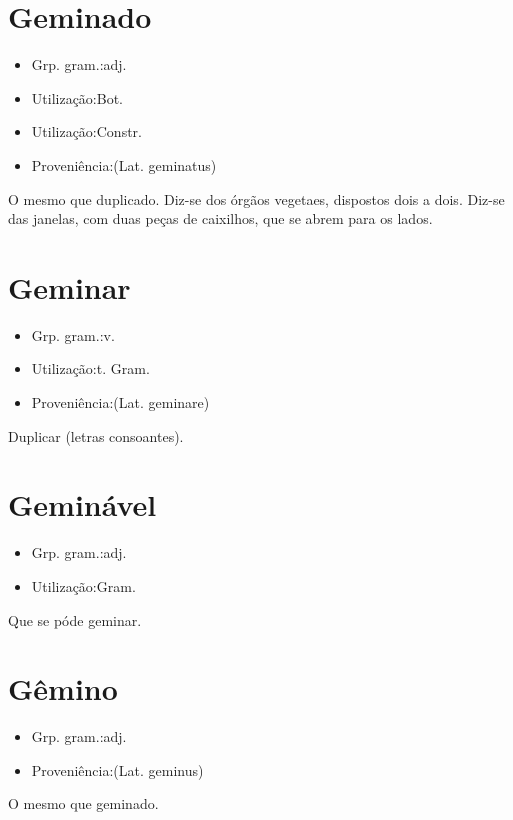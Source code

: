 \section{Geminado}
\begin{itemize}
\item {Grp. gram.:adj.}
\end{itemize}
\begin{itemize}
\item {Utilização:Bot.}
\end{itemize}
\begin{itemize}
\item {Utilização:Constr.}
\end{itemize}
\begin{itemize}
\item {Proveniência:(Lat. \textunderscore geminatus\textunderscore )}
\end{itemize}
O mesmo que \textunderscore duplicado\textunderscore .
Diz-se dos órgãos vegetaes, dispostos dois a dois.
Diz-se das janelas, com duas peças de caixilhos, que se abrem para os lados.
\section{Geminar}
\begin{itemize}
\item {Grp. gram.:v.}
\end{itemize}
\begin{itemize}
\item {Utilização:t. Gram.}
\end{itemize}
\begin{itemize}
\item {Proveniência:(Lat. \textunderscore geminare\textunderscore )}
\end{itemize}
Duplicar (letras consoantes).
\section{Geminável}
\begin{itemize}
\item {Grp. gram.:adj.}
\end{itemize}
\begin{itemize}
\item {Utilização:Gram.}
\end{itemize}
Que se póde geminar.
\section{Gêmino}
\begin{itemize}
\item {Grp. gram.:adj.}
\end{itemize}
\begin{itemize}
\item {Proveniência:(Lat. \textunderscore geminus\textunderscore )}
\end{itemize}
O mesmo que \textunderscore geminado\textunderscore .
